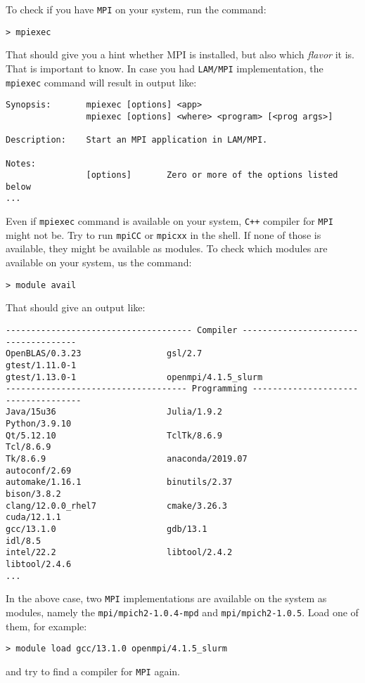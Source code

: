 To check if you have {\tt MPI} on your system, run the command:
%
\begin{verbatim}
> mpiexec
\end{verbatim}
%
That should give you a hint whether MPI is installed, but also which {\em flavor}
it is. That is important to know. In case you had {\tt LAM/MPI} implementation,
the {\tt mpiexec} command will result in output like:
%
{\small \begin{verbatim}
Synopsis:       mpiexec [options] <app>
                mpiexec [options] <where> <program> [<prog args>]

Description:    Start an MPI application in LAM/MPI.

Notes:
                [options]       Zero or more of the options listed below
...
\end{verbatim}}
%
Even if {\tt mpiexec} command is available on your system, {\tt C++} compiler
for {\tt MPI} might not be. Try to run {\tt mpiCC} or {\tt mpicxx} in the shell.
%
If none of those is available, they might be available as modules. To check 
which modules are available on your system, us the command:
%
\begin{verbatim}
> module avail
\end{verbatim}
%
That should give an output like:
%
{\small \begin{verbatim}
------------------------------------- Compiler -------------------------------------
OpenBLAS/0.3.23                 gsl/2.7                         gtest/1.11.0-1
gtest/1.13.0-1                  openmpi/4.1.5_slurm             
------------------------------------ Programming ------------------------------------
Java/15u36                      Julia/1.9.2                     Python/3.9.10
Qt/5.12.10                      TclTk/8.6.9                     Tcl/8.6.9
Tk/8.6.9                        anaconda/2019.07                autoconf/2.69
automake/1.16.1                 binutils/2.37                   bison/3.8.2
clang/12.0.0_rhel7              cmake/3.26.3                    cuda/12.1.1
gcc/13.1.0                      gdb/13.1                        idl/8.5
intel/22.2                      libtool/2.4.2                   libtool/2.4.6
...
\end{verbatim}}
%
In the above case, two {\tt MPI} implementations are available on the system as modules,
namely the {\tt mpi/mpich2-1.0.4-mpd} and {\tt mpi/mpich2-1.0.5}. Load one of them,
for example:
%
\begin{verbatim}
> module load gcc/13.1.0 openmpi/4.1.5_slurm
\end{verbatim}
%
and try to find a compiler for {\tt MPI} again. 

